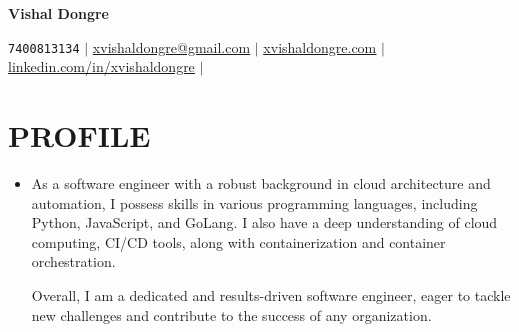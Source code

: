 \documentclass[letterpaper,11pt]{article}
\newcommand{\resumeItem}[1]{
  \item\small{
    {#1 \vspace{-1pt}}
  }
}
\newcommand{\resumeSubItem}[1]{\resumeItem{#1}\vspace{-4pt}}
\newcommand{\resumeSubHeadingListStart}{\begin{itemize}[leftmargin=0in, label={}]}
\newcommand{\resumeSubHeadingListEnd}{\end{itemize}}
\begin{document}
\begin{center}
    \textbf{\Huge Vishal Dongre} \\ \vspace{5pt}
    
    \small 
    \faPhone* \texttt{7400813134} \hspace{1pt} $|$
    \hspace{1pt} \faEnvelope \hspace{2pt} \href{mailto:xvishaldongre@gmail.com}{\underline{xvishaldongre@gmail.com}} \hspace{1pt} $|$
    \hspace{1pt} \faLink \hspace{2pt} \href{https://xvishaldongre.com}{\underline{xvishaldongre.com}} \hspace{1pt} $|$
    \hspace{1pt} \faLinkedin \hspace{2pt} \href{https://linkedin.com/in/xvishaldongre}{\underline{linkedin.com/in/xvishaldongre}} \hspace{1pt} $|$
    \\ \vspace{-3pt}
\end{center}

\section{PROFILE}
    \resumeSubHeadingListStart
      \resumeSubItem{As a software engineer with a robust background in cloud architecture and automation, I possess skills in various programming languages, including Python, JavaScript, and GoLang. I also have a deep understanding of cloud computing, CI/CD tools, along with containerization and container orchestration.

      Overall, I am a dedicated and results-driven software engineer, eager to tackle new challenges and contribute to the success of any organization.}
    \resumeSubHeadingListEnd

\end{document}
